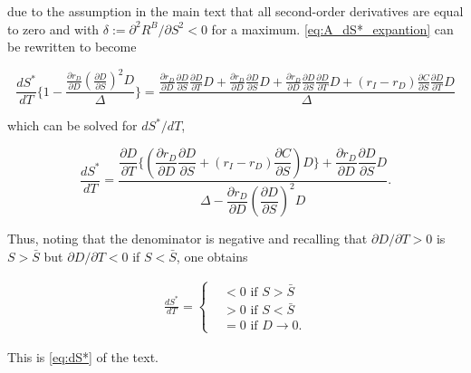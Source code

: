 \noindent due to the assumption in the main text that all second-order derivatives are equal to zero and with $\delta := \partial^2 R^B / \partial S^2 <0$ for a maximum. \autoref{eq:A_dS*_expantion} can be rewritten to become

\begin{equation}
\frac{dS^*}{dT} \bigg\{ 1 - \frac{\frac{\partial r_D}{\partial D} \left( \frac{\partial D}{\partial S} \right)^2 D }{\Delta}\bigg\}
= \frac{\frac{\partial r_D}{\partial D} \frac{\partial D}{\partial S} \frac{\partial D}{\partial T} D
+ \frac{\partial r_D}{\partial D} \frac{\partial D}{\partial S} D
+ \frac{\partial r_D}{\partial D} \frac{\partial D}{\partial S} \frac{\partial D}{\partial T} D+ (r_I - r_D) \frac{\partial C}{\partial S} \frac{\partial D}{\partial T} D}{\Delta} 
\end{equation}

\noindent which can be solved for $dS^*/dT$,

\begin{equation}
\frac{dS^*}{dT} = 
\frac{\dfrac{\partial D}{\partial T} \bigg\{ \left( \dfrac{\partial r_D}{\partial D} \dfrac{\partial D}{\partial S} + (r_I - r_D) \dfrac{\partial C}{\partial S} \right) D \bigg\} 
+ \dfrac{\partial r_D}{\partial D} \dfrac{\partial D}{\partial S} D}{\Delta - \dfrac{\partial r_D}{\partial D} \left( \dfrac{\partial D}{\partial S} \right)^2 D}. 
\end{equation}

Thus, noting that the denominator is negative and recalling that $\partial D/ \partial T>0 $ is $S>\bar{S}$ but $\partial D / \partial T <0$ if $S< \bar{S}$, one obtains

\begin{align}
    \frac{dS^*}{dT}=
    \begin{cases}
        &<0 \text{ if } S>\bar{S} \\
        &>0 \text{ if } S<\bar{S} \\
        &=0 \text{ if } D \to 0.
    \end{cases} \label{eq:A_dS*}
\end{align}

\noindent This is \autoref{eq:dS*} of the text.